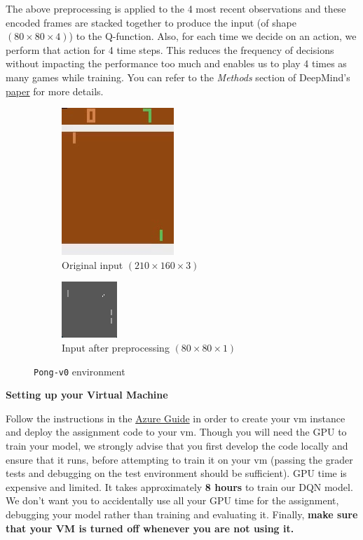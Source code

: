 The above preprocessing is applied to the 4 most recent observations and these encoded frames are stacked together to produce the input (of shape $(80 \times 80 \times 4)$) to the Q-function. Also, for each time we decide on an action, we perform that action for 4 time steps. This reduces the frequency of decisions without impacting the performance too much and enables us to play 4 times as many games while training. You can refer to the \textit{Methods} section of DeepMind's \href{https://storage.googleapis.com/deepmind-media/dqn/DQNNaturePaper.pdf}{paper} for more details. \\  

\begin{figure}[H]
\centering
\begin{subfigure}[b]{.4\textwidth}
  \centering
  \includegraphics[width=.25\linewidth]{images/pong}
  \caption{Original input $ (210 \times 160 \times 3)$ }
  \label{fig:pong}
\end{subfigure}
\begin{subfigure}[b]{.4\textwidth}
  \centering
  \includegraphics[width=.25\linewidth]{images/pong_grey}
  \caption{Input after preprocessing $ (80 \times 80 \times 1 ) $}
  \label{fig:pong_grey}
\end{subfigure}
\caption{\texttt{Pong-v0} environment}
\label{fig:pong_env}
\end{figure}

\textbf{Setting up your Virtual Machine}

Follow the instructions in the \href{https://github.com/scpd-proed/XCS234-Handouts/blob/main/Azure/Azure%20Guide.pdf}{Azure Guide} in order to create your vm instance and deploy the assignment code to your vm. Though you will need the GPU to train your model, we strongly advise that you first develop the code locally and ensure that it runs, before attempting to train it on your vm (passing the grader tests and debugging on the test environment should be sufficient). GPU time is expensive and limited. It takes approximately \textbf{8 hours} to train our DQN model. We don't want you to accidentally use all your GPU time for the assignment, debugging your model rather than training and evaluating it. Finally, \textbf{make sure that your VM is turned off whenever you are not using it.}

